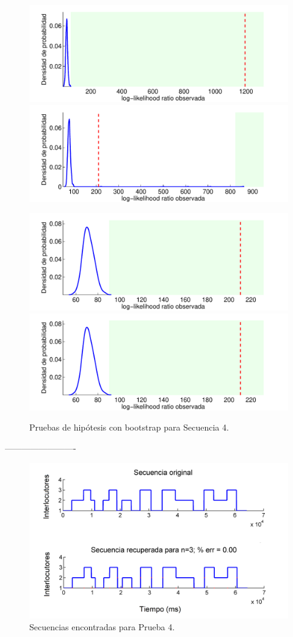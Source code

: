 \begin{figure}[H]
  \centerline  
  {\includegraphics[width=0.6\linewidth]{gfx/chap6/noctboot1}
   \includegraphics[width=0.6\linewidth]{gfx/chap6/noctboot2} }
  \centerline  
  {\includegraphics[width=0.6\linewidth]{gfx/chap6/noctboot3}
   \includegraphics[width=0.6\linewidth]{gfx/chap6/noctboot3}
  } \quad
  \caption{Pruebas de hipótesis con bootstrap para Secuencia 4.}
  \label{fig:prb1_boot}
\end{figure}

-------------------------

\begin{figure}[H]
  \centerline
  {\includegraphics[width=0.8\linewidth]{gfx/chap6/noct1_}} \quad
  \caption{Secuencias encontradas para Prueba 4.}
  \label{fig:prb1_seq}
\end{figure}

